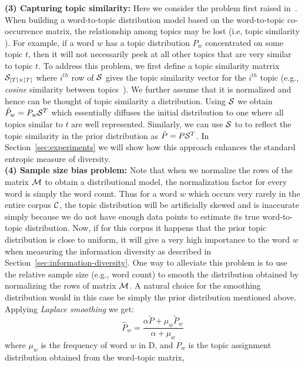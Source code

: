 \documentclass{article} %
\begin{document}
{\bf (3) Capturing topic similarity:} Here we consider the problem first raised in~\cite{bache:2013}. When building a word-to-topic distribution model based on 
the word-to-topic co-occurrence matrix, the relationship among topics may be lost (i.e, topic similarity ).  For example, if a word $w$
has a topic distribution $P_w$ concentrated on some topic $t$, then it will
not necessarily peek at all other topics that are very similar to topic $t$. To address this problem, we first define a topic similarity matrrix ${\mathcal S}_{|T|\times|T|}$
where $i^{th}$ row of ${\mathcal S}$ gives the topic similarity vector for the $i^{th}$ topic (e.g., {\em cosine} similarity between topics~\cite{bache:2013}). We further assume that it is normalized 
and hence can be thought of topic similarity a distribution. Using ${\mathcal S}$ we obtain $\tilde{P}_w = P_w{\mathcal S}^T$ which essentially diffuses the initial distribution to
one where  all topics similar to $t$ are well represented. Similarly, we can use ${\mathcal S}$ to to reflect the topic similarity in the prior distribution as $\tilde{P} = P{\mathcal S}^T$.
In Section~\ref{sec:experiments} we will show how this
approach enhances the standard entropic measure of diversity.\\
{\bf (4) Sample size bias problem:}  Note that 
when we normalize the rows of the matrix ${\mathcal M}$ to obtain a distributional model, the normalization factor 
for every word is simply the word count. Thus for a word $w$ which occurs very rarely
in the entire corpus ${\mathcal C}$, the topic distribution will be artificially skewed and is inaccurate simply because we do not have enough data points to estimate its true word-to-topic distribution.
Now, if for this corpus it happens that the prior topic distribution
is close to uniform, it will give a very high importance to the word
$w$ when measuring the information diversity as described in
Section~\ref{sec:information-diversity}.
One way to alleviate this
problem is to use the relative sample size (e.g., word count) to
smooth the distribution obtained by normalizing the rows of matrix
${\mathcal M}$. A natural choice for the smoothing distribution would in this
case be simply the prior distribution mentioned above. Applying {\em Laplace smoothing}
we get:
\begin{equation}
\widehat{P}_w=\frac{\alpha \tilde{P}+ \mu_w \tilde{P}_w}{\alpha+\mu_w}
\end{equation}
where $\mu_w$ is the frequency of word $w$ in D, and $P_w$ is the
topic assignment distribution obtained from the word-topic matrix,
\end{document}
